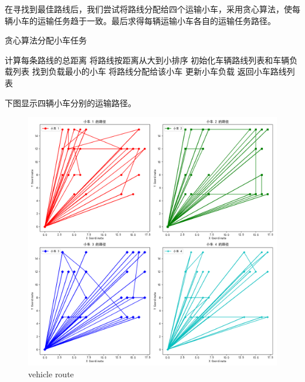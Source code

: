 \documentclass[withoutpreface,bwprint]{thesis-config}
\begin{document}
\par 在寻找到最佳路线后，我们尝试将路线分配给四个运输小车，采用贪心算法，使每辆小车的运输任务趋于一致。最后求得每辆运输小车各自的运输任务路径。
\newpage
\begin{breakablealgorithm}
    \caption{贪心算法分配小车任务}
    \begin{algorithmic}[1]
            \State 计算每条路线的总距离
            \State 将路线按距离从大到小排序
            \State 初始化车辆路线列表和车辆负载列表
                \State 找到负载最小的小车
                \State 将路线分配给该小车
                \State 更新小车负载
            \EndFor
            \State 返回小车路线列表
        \EndFunction
    \end{algorithmic}
\end{breakablealgorithm}

\par 下图显示四辆小车分别的运输路径。
    \begin{figure}[!htbp]
        \centering
        \begin{minipage}[b]{0.75\linewidth}
            \centering
            \includegraphics[width=1\textwidth]{figures/result1.3.png}
            \caption{vehicle route}
        \end{minipage}
    \end{figure}
\end{document}
